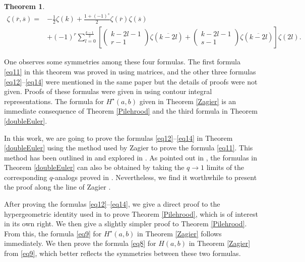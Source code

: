 \documentclass[reqno]{amsart}
\newtheorem{theorem}{Theorem}[section]
\theoremstyle{definition}
\theoremstyle{remark}
\numberwithin{equation}{section}
\begin{document}
\begin{theorem}
\begin{equation}\label{eq14}\begin{split}
\zeta(\overline{r}, \overline{s})=&-\frac{1}{2}\zeta(k)
+\frac{1+(-1)^s}{2}\zeta(\overline{r})\zeta(\overline{s})
\\&+(-1)^r\sum_{l=0}^{\frac{k-1}{2}}\left[\begin{pmatrix}k-2l-1\\r-1\end{pmatrix}\zeta(\overline{k-2l})
+ \begin{pmatrix}k-2l-1\\s-1\end{pmatrix}\zeta(\overline{k-2l})\right]\zeta(2l).
\end{split}\end{equation}
\end{theorem}
One observes some symmetries  among these  four formulas. The first formula \eqref{eq11} in this theorem was proved in \cite{6} using matrices, and the other three  formulas \eqref{eq12}--\eqref{eq14} were mentioned in the same paper but the details of proofs   were not given. Proofs of these formulas were given in \cite{15} using contour integral representations. The formula for $H^{\star}(a, b)$ given in Theorem \ref{Zagier} is an immediate consequence of Theorem \ref{Pilehrood} and the third formula in Theorem \ref{doubleEuler}.

In this work, we are going to prove the   formulas \eqref{eq12}--\eqref{eq14} in Theorem \ref{doubleEuler} using the method used by Zagier \cite{1}  to prove the   formula \eqref{eq11}. This method has been outlined in \cite{8} and explored in \cite{10}. As pointed out in \cite{9}, the formulas in Theorem \ref{doubleEuler} can also be obtained by taking the $q\rightarrow 1$ limits of the corresponding $q$-analogs proved in \cite{14}. Nevertheless, we find it worthwhile to present the proof along the line of Zagier \cite{1}.

After proving the   formulas \eqref{eq12}--\eqref{eq14}, we give a direct proof to the hypergeometric identity used in \cite{3} to prove Theorem \ref{Pilehrood}, which is of interest in its own right. We then give a slightly simpler proof to Theorem \ref{Pilehrood}. From this, the formula \eqref{eq9} for $H^{\star}(a,b)$ in Theorem \ref{Zagier} follows immediately. We then prove the formula \eqref{eq8} for $H(a,b)$ in Theorem \ref{Zagier} from \eqref{eq9}, which better reflects the symmetries between these two formulas.
\end{document}
